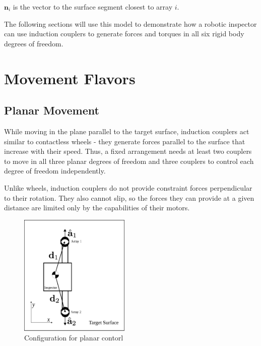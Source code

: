\documentclass[letterpaper, 10 pt, conference]{ieeeconf}  %
\begin{document}
 $\textbf{n}_i$ is the vector to the surface segment closest to array $i$.  
 
 The following sections will use this model to demonstrate how a robotic inspector can use induction couplers to generate forces and torques in all six rigid body degrees of freedom.

%

\section{Movement Flavors}\label{sec:movements}
\subsection{Planar Movement}\label{sec:planar_locomotion}
While moving in the plane parallel to the target surface, induction couplers act similar to contactless wheels - they generate forces parallel to the surface that increase with their speed. Thus, a fixed arrangement needs at least two couplers to move in all three planar degrees of freedom and three couplers to control each degree of freedom independently.    
% 

Unlike wheels, induction couplers do not provide constraint forces perpendicular to their rotation. They also cannot slip, so the forces they can provide at a given distance are limited only by the capabilities of their motors. 
%



 
   \begin{figure}[thpb]
      \centering
      \includegraphics[width = 0.47\textwidth]{figures/surface_locomotion.eps}
      \caption{Configuration for planar contorl}
      \label{fig:planarsetup}
   \end{figure}
\end{document}
